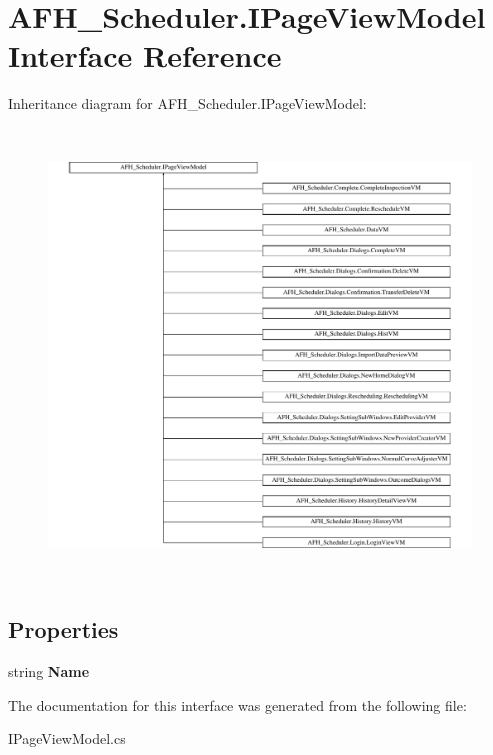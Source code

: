 \section{A\+F\+H\+\_\+\+Scheduler.\+I\+Page\+View\+Model Interface Reference}
\label{interface_a_f_h___scheduler_1_1_i_page_view_model}
Inheritance diagram for A\+F\+H\+\_\+\+Scheduler.\+I\+Page\+View\+Model\+:\begin{figure}[H]
\begin{center}
\leavevmode
\includegraphics[height=12.000000cm]{interface_a_f_h___scheduler_1_1_i_page_view_model}
\end{center}
\end{figure}
\subsection*{Properties}
\begin{DoxyCompactItemize}
\item 
\mbox{\label{interface_a_f_h___scheduler_1_1_i_page_view_model_a1a4df25f977e3890b41f27f9e14fe2a4}} 
string {\bfseries Name}\hspace{0.3cm}{\ttfamily  [get]}
\end{DoxyCompactItemize}


The documentation for this interface was generated from the following file\+:\begin{DoxyCompactItemize}
\item 
I\+Page\+View\+Model.\+cs\end{DoxyCompactItemize}
